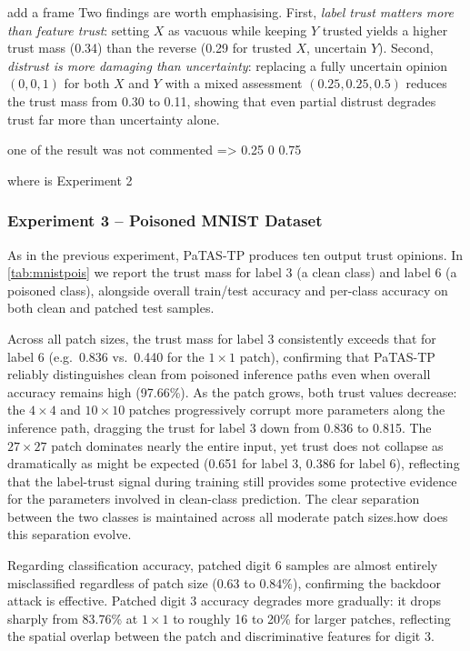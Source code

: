 \todo add a frame 
Two findings are worth emphasising. First, \emph{label trust matters more than
feature trust}: setting $X$ as vacuous while keeping $Y$ trusted yields a higher
trust mass (0.34) than the reverse (0.29 for trusted $X$, uncertain $Y$). Second,
\emph{distrust is more damaging than uncertainty}: replacing a fully uncertain
opinion $(0,0,1)$ for both $X$ and $Y$ with a mixed assessment $(0.25,0.25,0.5)$
reduces the trust mass from 0.30 to 0.11, showing that even partial distrust
degrades trust far more than uncertainty alone.

\todo one of the result was not commented => 0.25 0 0.75 

\todo where is Experiment 2 

\subsubsection*{Experiment 3 -- Poisoned MNIST Dataset}
As in the previous experiment, \ac{PaTAS-TP} produces ten output trust opinions.
In \cref{tab:mnistpois} we report the trust mass for label 3 (a clean class) and
label 6 (a poisoned class), alongside overall train/test accuracy and per-class
accuracy on both clean and patched test samples.

Across all patch sizes, the trust mass for label 3 consistently exceeds that for
label 6 (e.g.\ 0.836 vs.\ 0.440 for the $1\times1$ patch), confirming that
\ac{PaTAS-TP} reliably distinguishes clean from poisoned inference paths even when
overall accuracy remains high (97.66\%). As the patch grows, both trust values
decrease: the $4\times4$ and $10\times10$ patches progressively corrupt more
parameters along the inference path, dragging the trust for label 3 down from
0.836 to 0.815. The $27\times27$ patch dominates nearly the entire input, yet
trust does not collapse as dramatically as might be expected (0.651 for label 3,
0.386 for label 6), reflecting that the label-trust signal during training still
provides some protective evidence for the parameters involved in clean-class
prediction. The clear separation between the two classes is maintained across all
moderate patch sizes.\todo how does this separation evolve.

Regarding classification accuracy, patched digit 6 samples are almost entirely
misclassified regardless of patch size (0.63 to 0.84\%), confirming the backdoor
attack is effective. Patched digit 3 accuracy degrades more gradually: it drops
sharply from 83.76\% at $1\times1$ to roughly 16 to 20\% for larger patches,
reflecting the spatial overlap between the patch and discriminative features
for digit 3.



